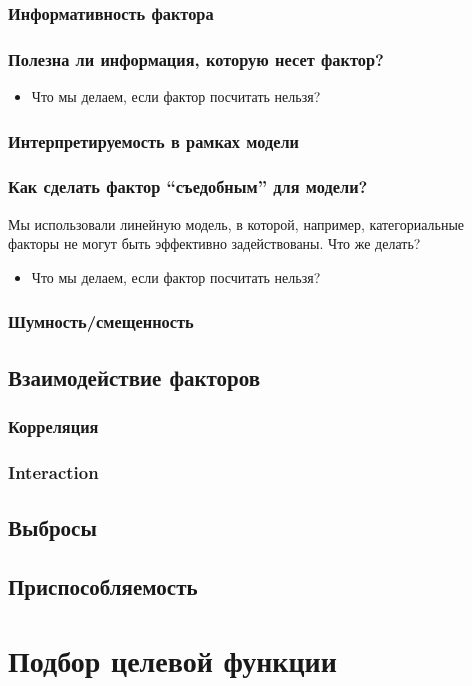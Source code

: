 \documentclass[14pt, fleqn, xcolor={dvipsnames, table}]{beamer}
\begin{document}
\subsubsection{Информативность фактора}
\begin{frame}[t]\frametitle{Полезна ли информация, которую несет фактор?}

\begin{itemize}
  \item Что мы делаем, если фактор посчитать нельзя?
\end{itemize}
\end{frame}

\subsubsection{Интерпретируемость в рамках модели}
\begin{frame}[t]\frametitle{Как сделать фактор ``съедобным'' для модели?}
Мы использовали линейную модель, в которой, например, категориальные факторы не могут быть эффективно задействованы. Что же делать?
\begin{itemize}
  \item Что мы делаем, если фактор посчитать нельзя?
\end{itemize}
\end{frame}
\subsubsection{Шумность/смещенность}
\subsection{Взаимодействие факторов}
\subsubsection{Корреляция}
\subsubsection{Interaction}
\subsection{Выбросы}
\subsection{Приспособляемость}
\section{Подбор целевой функции}
\end{document}
